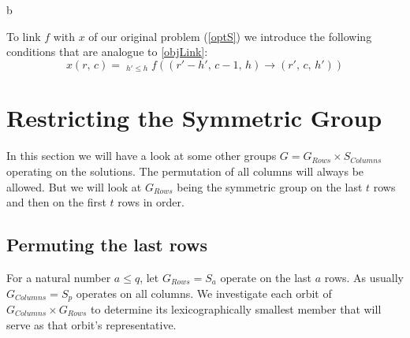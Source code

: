 b\documentclass[a4paper]{amsart}
\theoremstyle{definition}
\begin{document}


To link \(f\) with \(x\) of our original problem (\ref{optS}) we
introduce the following conditions that are analogue to \ref{objLink}:
\begin{equation}
  x \left( r,\, c \right) =
  \mathop{\sum_{r' - h' \leq r \leq r'}}_{h' \leq h} f\left(\left(r'-h',\, c-1,\, h\right)
    \rightarrow \left(r',\, c,\, h'\right) \right)
\end{equation}

\section{Restricting the Symmetric Group}
In this section we will have a look at some other groups \(G =
G_{Rows} \times S_{Columns}\)
operating on the solutions.  The
permutation of all columns will always be allowed.  But we will look at
\(G_{Rows}\) being the symmetric group on the last \(t\) rows and then
on the first \(t\) rows in order.



\subsection{Permuting the last rows}

For a natural number \(a \leq q\), let \(G_{Rows} = S_a\) operate on
the last \(a\) rows.  As usually \(G_{Columns} = S_p\) operates on all
columns.  We investigate each orbit of \(G_{Columns} \times G_{Rows}\)
to determine its lexicographically smallest member that will serve as
that orbit's representative.






\end{document}
